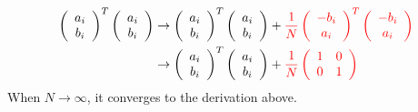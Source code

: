 \documentclass{article}
\newcommand{\nc}{\textcolor{red}}
\begin{document}
\begin{align}
\left( \begin{array}{c} a_i\\b_i\end{array} \right)^T
\left( \begin{array}{c} a_i\\b_i\end{array} \right)
&\rightarrow
\left( \begin{array}{c} a_i\\b_i\end{array} \right)^T
\left( \begin{array}{c} a_i\\b_i\end{array} \right)
+\nc{\frac{1}{N}
\left( \begin{array}{c} -b_i\\a_i\end{array} \right)^T
\left( \begin{array}{c} -b_i\\a_i\end{array} \right)
}\nonumber\\
&\rightarrow
\left( \begin{array}{cc} a_i\\b_i\end{array} \right)^T
\left( \begin{array}{c} a_i\\b_i\end{array} \right)
+\nc{\frac{1}{N}
\left( \begin{array}{cc} 1&0\\0&1\end{array} \right)
}\nonumber
\end{align}
When $N\rightarrow\infty$, it converges to the derivation above.
\end{document}
